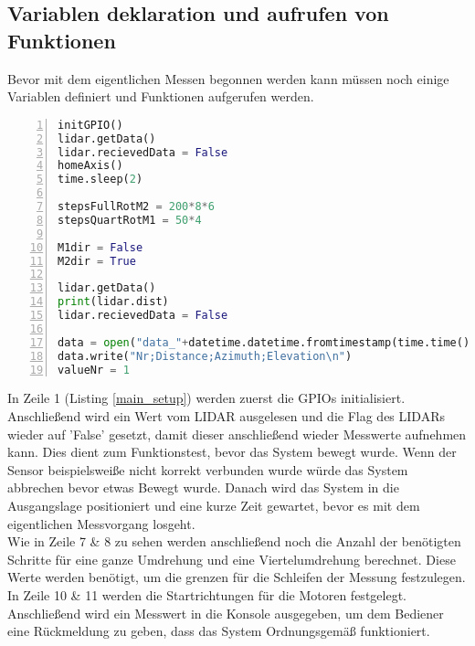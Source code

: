\subsection{Variablen deklaration und aufrufen von Funktionen}
Bevor mit dem eigentlichen Messen begonnen werden kann müssen noch einige Variablen definiert und Funktionen aufgerufen werden.
\begin{lstlisting}[caption={Aufrufen von Funktionen und Variablen deklaration}, language={Python}, label={main_setup}, numbers=left]
initGPIO()
lidar.getData()
lidar.recievedData = False
homeAxis()
time.sleep(2)

stepsFullRotM2 = 200*8*6
stepsQuartRotM1 = 50*4

M1dir = False
M2dir = True

lidar.getData()
print(lidar.dist)
lidar.recievedData = False

data = open("data_"+datetime.datetime.fromtimestamp(time.time()).strftime('%Y-%m-%d_%H-%M-%S')+".csv", "w")
data.write("Nr;Distance;Azimuth;Elevation\n")
valueNr = 1
\end{lstlisting}
In Zeile 1 (Listing \ref{main_setup}) werden zuerst die \acp{GPIO} initialisiert. Anschließend wird ein Wert vom \ac{LIDAR} ausgelesen  und die Flag des \acp{LIDAR} wieder auf 'False' gesetzt, damit dieser anschließend wieder Messwerte aufnehmen kann. Dies dient zum Funktionstest, bevor das System bewegt wurde. Wenn der Sensor beispielsweiße nicht korrekt verbunden wurde würde das System abbrechen bevor etwas Bewegt wurde. Danach wird das System in die Ausgangslage positioniert und eine kurze Zeit gewartet, bevor es mit dem eigentlichen Messvorgang losgeht.\\
Wie in Zeile 7 \& 8 zu sehen werden anschließend noch die Anzahl der benötigten Schritte für eine ganze Umdrehung und eine Viertelumdrehung berechnet. Diese Werte werden benötigt, um die grenzen für die Schleifen der Messung festzulegen.  \\
In Zeile 10 \& 11 werden die Startrichtungen für die Motoren festgelegt.\\
Anschließend wird ein Messwert in die Konsole ausgegeben, um dem Bediener eine Rückmeldung zu geben, dass das System Ordnungsgemäß funktioniert.\\
